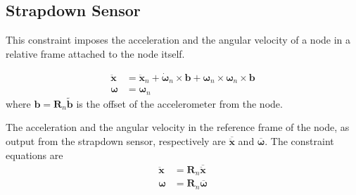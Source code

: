 \documentclass[10pt,fleqn,subeqn]{report}
\newcommand{\T}[1]{\bm{#1}}
\newcommand{\TT}[1]{\bm{#1}}
\begin{document}
\begin{comment}
\paragraph{Physics.}
In other words, node 1 is the screw and node 2 is the bolt;
neglecting the offset, the force along the screw axis is related
to the couple about the same axis by the relationship
\begin{equation}
	C = - \frac{p}{2\pi} F
\end{equation}
which results from a power balance
\begin{equation}
	C \omega_r + F v_r = 0
\end{equation}
in terms of relative linear ($v_r$) and angular ($\omega_r$) velocity,
with the kinematic relationship
\begin{equation} 
	v_r = \frac{p}{2\pi} \omega_r
\end{equation}

A foreseen improvement consists in adding friction based on empirical
formulas for screws.
\end{comment}




\subsection{Strapdown Sensor}
This constraint imposes the acceleration and the angular velocity
of a node in a relative frame attached to the node itself.

\begin{subequations}
\begin{align}
	\ddot{\T{x}}
	&=
	\ddot{\T{x}}_n
	+
	\dot{\T{\omega}}_n \times \T{b}
	+
	\T{\omega}_n \times \T{\omega}_n \times \T{b}
	\\
	\T{\omega}
	&=
	\T{\omega}_n
\end{align}
\end{subequations}
where $\T{b} = \TT{R}_n \tilde{\T{b}}$ is the offset of the accelerometer
from the node.

The acceleration and the angular velocity in the reference frame
of the node, as output from the strapdown sensor, respectively are
$\overline{\ddot{\T{x}}}$ and $\overline{\T{\omega}}$.
The constraint equations are
\begin{subequations}
\begin{align}
	\ddot{\T{x}}
	&=
	\TT{R}_n \overline{\ddot{\T{x}}}
	\\
	\T{\omega}
	&=
	\TT{R}_n \overline{\T{\omega}}
\end{align}
\end{subequations}
\end{document}
